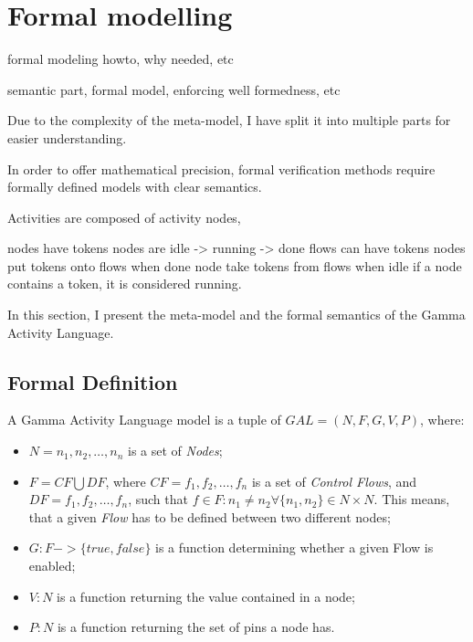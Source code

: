 \clearpage\section{Formal modelling}


formal modeling howto, why needed, etc

semantic part, formal model, enforcing well formedness, etc

Due to the complexity of the meta-model, I have split it into multiple parts for easier understanding.


In order to offer mathematical precision, formal verification methods require formally defined models with clear semantics. 

Activities are composed of activity nodes, 

nodes have tokens
nodes are idle -> running -> done
flows can have tokens
nodes put tokens onto flows when done
node take tokens from flows when idle
if a node contains a token, it is considered running.

In this section, I present the meta-model and the formal semantics of the Gamma Activity Language.

\subsection{Formal Definition}

\begin{definition}
	A Gamma Activity Language model is a tuple of \(GAL = (N, F, G, V, P)\), where:
	
	\begin{itemize}
		\item \(N = { n_1, n_2, \dots, n_n } \) is a set of \emph{Nodes};
		\item \(F = CF \bigcup DF \), where \( CF = { f_1, f_2, \dots, f_n } \) is a set of \emph{Control Flows}, and \( DF = { f_1, f_2, \dots, f_n } \), such that \(f \in F : n_1 \neq n_2 \forall \{n_1, n_2\} \in N \times N\). This means, that a given \emph{Flow} has to be defined between two different nodes;
		\item \(G : F -> \{true, false\} \) is a function determining whether a given Flow is enabled;
		\item \(V : N \) is a function returning the value contained in a node;
		\item \(P : N \) is a function returning the set of pins a node has.
	\end{itemize}
	
\end{definition}

